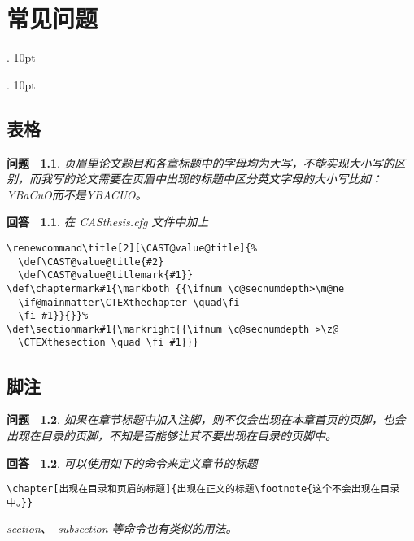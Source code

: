 ﻿
\chapter{常见问题}
\label{chap:faq}

  {}%
  {}%
  {\tt}%
  {}%
  {\bfseries}%
  {.}%
  {10pt}%
  {}%

  {}%
  {}%
  {\rm}%
  {}%
  {\bfseries}%
  {.}%
  {10pt}%
  {}%

\theoremstyle{question}
 \newtheorem{FAQ}{问题~}
\theoremstyle{answer}
 \newtheorem{ANS}{回答~}

\section{表格}

\begin{FAQ}
页眉里论文题目和各章标题中的字母均为大写，不能实现大小写的区别，而我写的论文需要在页眉中出现的标题中区分英文字母的大小写比如：YBaCuO而不是YBACUO。
\end{FAQ}

\begin{ANS}
在 CASthesis.cfg 文件中加上
\begin{verbatim}
\renewcommand\title[2][\CAST@value@title]{%
  \def\CAST@value@title{#2}
  \def\CAST@value@titlemark{#1}}
\def\chaptermark#1{\markboth {{\ifnum \c@secnumdepth>\m@ne
  \if@mainmatter\CTEXthechapter \quad\fi
  \fi #1}}{}}%
\def\sectionmark#1{\markright{{\ifnum \c@secnumdepth >\z@
  \CTEXthesection \quad \fi #1}}}
\end{verbatim}
\end{ANS}


\section{脚注}

\begin{FAQ}
如果在章节标题中加入注脚，则不仅会出现在本章首页的页脚，也会出现在目录的页脚，不知是否能够让其不要出现在目录的页脚中。
\end{FAQ}

\begin{ANS}
可以使用如下的命令来定义章节的标题
\begin{verbatim}
\chapter[出现在目录和页眉的标题]{出现在正文的标题\footnote{这个不会出现在目录中。}}
\end{verbatim}
section、~subsection 等命令也有类似的用法。
\end{ANS}
